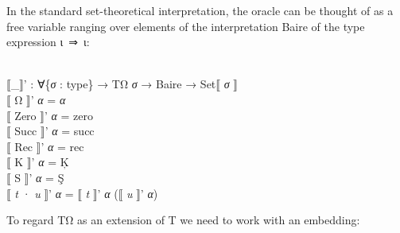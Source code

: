 \documentclass{entcs} \usepackage{prentcsmacro}
\newcommand{\AgdaC}[1]{\mbox{#1}}
\newcommand{\AgdaFontStyle}[1]{\textsf{#1}}
\newcommand{\AgdaBoundFontStyle}[1]{\textit{#1}}
\newcommand{\AgdaSymbol}      [1]{\textcolor{AgdaSymbol}{#1}}
\newcommand{\AgdaBound}    [1]{\AgdaBoundFontStyle{\textcolor{AgdaBound}{#1}}}
\newcommand{\AgdaInductiveConstructor}[1]
    {\AgdaFontStyle{\textcolor{AgdaInductiveConstructor}{#1}}}
\newcommand{\AgdaDatatype} [1]{\AgdaFontStyle{\textcolor{AgdaDatatype}{#1}}}
\newcommand{\AgdaFunction} [1]{\AgdaFontStyle{\textcolor{AgdaFunction}{#1}}}
\newcommand{\AgdaCodeStyle}{\small}
\newenvironment{code}%
{\noindent\AgdaCodeStyle\pboxed}%
{\endpboxed\par\noindent%
\ignorespacesafterend}
\begin{document}
In the standard set-theoretical interpretation, the oracle can be
thought of as a free variable ranging over elements of the
interpretation Baire of the type expression \AgdaC{ι ⇒ ι}:

\begin{code}\>\<%
\\
\>\AgdaFunction{⟦\_⟧'} \AgdaSymbol{:} \AgdaSymbol{∀\{}\AgdaBound{σ} \AgdaSymbol{:} \AgdaDatatype{type}\AgdaSymbol{\}} \AgdaSymbol{→} \AgdaDatatype{TΩ} \AgdaBound{σ} \AgdaSymbol{→} \AgdaFunction{Baire} \AgdaSymbol{→} \AgdaFunction{Set⟦} \AgdaBound{σ} \AgdaFunction{⟧}\<%
\\
\>\AgdaFunction{⟦} \AgdaInductiveConstructor{Ω} \AgdaFunction{⟧'} \<[11]%
\>[11]\AgdaBound{α} \AgdaSymbol{=} \AgdaBound{α}\<%
\\
\>\AgdaFunction{⟦} \AgdaInductiveConstructor{Zero} \AgdaFunction{⟧'} \<[11]%
\>[11]\AgdaBound{α} \AgdaSymbol{=} \AgdaInductiveConstructor{zero}\<%
\\
\>\AgdaFunction{⟦} \AgdaInductiveConstructor{Succ} \AgdaFunction{⟧'} \<[11]%
\>[11]\AgdaBound{α} \AgdaSymbol{=} \AgdaInductiveConstructor{succ}\<%
\\
\>\AgdaFunction{⟦} \AgdaInductiveConstructor{Rec} \AgdaFunction{⟧'} \<[11]%
\>[11]\AgdaBound{α} \AgdaSymbol{=} \AgdaFunction{rec}\<%
\\
\>\AgdaFunction{⟦} \AgdaInductiveConstructor{K} \AgdaFunction{⟧'} \<[11]%
\>[11]\AgdaBound{α} \AgdaSymbol{=} \AgdaFunction{Ķ}\<%
\\
\>\AgdaFunction{⟦} \AgdaInductiveConstructor{S} \AgdaFunction{⟧'} \<[11]%
\>[11]\AgdaBound{α} \AgdaSymbol{=} \AgdaFunction{Ş}\<%
\\
\>\AgdaFunction{⟦} \AgdaBound{t} \AgdaInductiveConstructor{·} \AgdaBound{u} \AgdaFunction{⟧'} \<[15]%
\>[15]\AgdaBound{α} \AgdaSymbol{=} \AgdaFunction{⟦} \AgdaBound{t} \AgdaFunction{⟧'} \AgdaBound{α} \AgdaSymbol{(}\AgdaFunction{⟦} \AgdaBound{u} \AgdaFunction{⟧'} \AgdaBound{α}\AgdaSymbol{)}\<%
\\
\>\<\end{code}
To regard TΩ as an extension of T we need to work with an
embedding:
\end{document}
